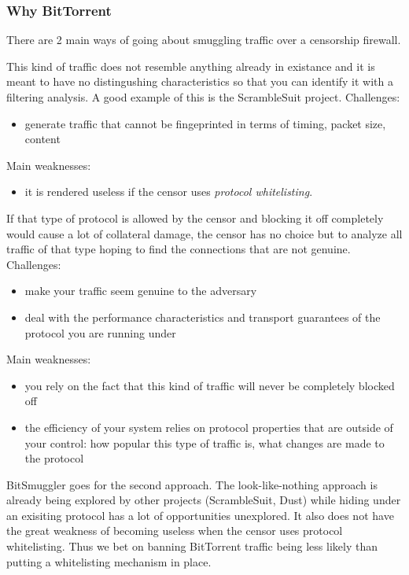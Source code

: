 \documentclass[11pt]{article} %
\newcommand{\projectName}{BitSmuggler }
\begin{document}
\subsubsection{Why BitTorrent}
There are 2 main ways of going about smuggling traffic over a censorship firewall.


This kind of traffic does not resemble anything already in existance and it is meant to have no distingushing characteristics so that you can identify it with a filtering analysis. A good example of this is the ScrambleSuit project.
Challenges:
\begin{itemize}
\item generate traffic that cannot be fingeprinted in terms of timing, packet size, content
\end{itemize}
Main weaknesses:
\begin{itemize}
\item it is rendered useless if the censor uses \textit{protocol whitelisting}. 
\end{itemize}



If that type of protocol is allowed by the censor and blocking it off completely would cause a lot of collateral damage, the censor has no choice but to analyze all traffic of that type hoping to find the connections that 
are not genuine.
Challenges:
\begin{itemize}
\item make your traffic seem genuine to the adversary
\item deal with the performance characteristics and transport guarantees of the protocol you are running under
\end{itemize}
Main weaknesses:
\begin{itemize}
\item you rely on the fact that this kind of traffic will never be completely blocked off
\item the efficiency of your system relies on protocol properties that are outside of your control: how popular this type of traffic is, what changes are made to the protocol 
\end{itemize}

\projectName goes for the second approach. The look-like-nothing approach is already being explored by other projects (ScrambleSuit, Dust) while hiding under an exisiting protocol has a lot of opportunities unexplored. It also does not have the great weakness of becoming useless when the censor uses protocol whitelisting. Thus we bet on banning BitTorrent traffic being less likely than putting a whitelisting mechanism in place.
\end{document}
